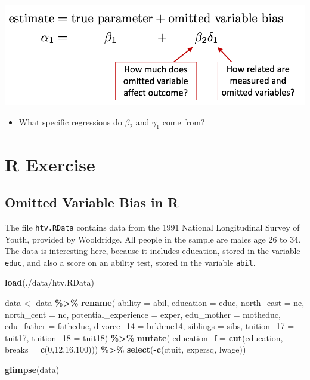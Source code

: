 \documentclass[
]{book}
\newenvironment{Shaded}{\begin{snugshade}}{\end{snugshade}}
\newcommand{\AttributeTok}[1]{\textcolor[rgb]{0.13,0.29,0.53}{#1}}
\newcommand{\DecValTok}[1]{\textcolor[rgb]{0.00,0.00,0.81}{#1}}
\newcommand{\FunctionTok}[1]{\textcolor[rgb]{0.13,0.29,0.53}{\textbf{#1}}}
\newcommand{\NormalTok}[1]{#1}
\newcommand{\OtherTok}[1]{\textcolor[rgb]{0.56,0.35,0.01}{#1}}
\newcommand{\SpecialCharTok}[1]{\textcolor[rgb]{0.81,0.36,0.00}{\textbf{#1}}}
\newcommand{\StringTok}[1]{\textcolor[rgb]{0.31,0.60,0.02}{#1}}
\providecommand{\tightlist}{%
  \setlength{\itemsep}{0pt}\setlength{\parskip}{0pt}}
\theoremstyle{definition}
\theoremstyle{definition}
\theoremstyle{definition}
\theoremstyle{definition}
\theoremstyle{remark}
\begin{document}
\includegraphics[width=0.8\linewidth,height=\textheight,keepaspectratio]{images/ovb.png}

\begin{itemize}
\tightlist
\item
  What specific regressions do \(\beta_2\) and \(\gamma_1\) come from?
\end{itemize}

\section{R Exercise}\label{r-exercise-2}

\subsection{Omitted Variable Bias in R}\label{omitted-variable-bias-in-r}

The file \texttt{htv.RData} contains data from the 1991 National Longitudinal Survey of Youth, provided by Wooldridge. All people in the sample are males age 26 to 34. The data is interesting here, because it includes education, stored in the variable \texttt{educ}, and also a score on an ability test, stored in the variable \texttt{abil}.

\begin{Shaded}
\begin{Highlighting}[]
\FunctionTok{load}\NormalTok{(}\StringTok{\textquotesingle{}./data/htv.RData\textquotesingle{}}\NormalTok{)}

\NormalTok{data }\OtherTok{\textless{}{-}}\NormalTok{ data }\SpecialCharTok{\%\textgreater{}\%} 
  \FunctionTok{rename}\NormalTok{(}
    \AttributeTok{ability    =}\NormalTok{ abil, }
    \AttributeTok{education  =}\NormalTok{ educ, }
    \AttributeTok{north\_east =}\NormalTok{ ne, }
    \AttributeTok{north\_cent =}\NormalTok{ nc, }
    \AttributeTok{potential\_experience =}\NormalTok{ exper, }
    \AttributeTok{edu\_mother =}\NormalTok{ motheduc, }
    \AttributeTok{edu\_father =}\NormalTok{ fatheduc, }
    \AttributeTok{divorce\_14 =}\NormalTok{ brkhme14, }
    \AttributeTok{siblings   =}\NormalTok{ sibs, }
    \AttributeTok{tuition\_17 =}\NormalTok{ tuit17, }
    \AttributeTok{tuition\_18 =}\NormalTok{ tuit18) }\SpecialCharTok{\%\textgreater{}\%} 
  \FunctionTok{mutate}\NormalTok{(}
    \AttributeTok{education\_f =} \FunctionTok{cut}\NormalTok{(education, }\AttributeTok{breaks =} \FunctionTok{c}\NormalTok{(}\DecValTok{0}\NormalTok{,}\DecValTok{12}\NormalTok{,}\DecValTok{16}\NormalTok{,}\DecValTok{100}\NormalTok{))) }\SpecialCharTok{\%\textgreater{}\%}
  \FunctionTok{select}\NormalTok{(}\SpecialCharTok{{-}}\FunctionTok{c}\NormalTok{(ctuit, expersq, lwage))}
  
\FunctionTok{glimpse}\NormalTok{(data)}
\end{Highlighting}
\end{Shaded}
\end{document}
